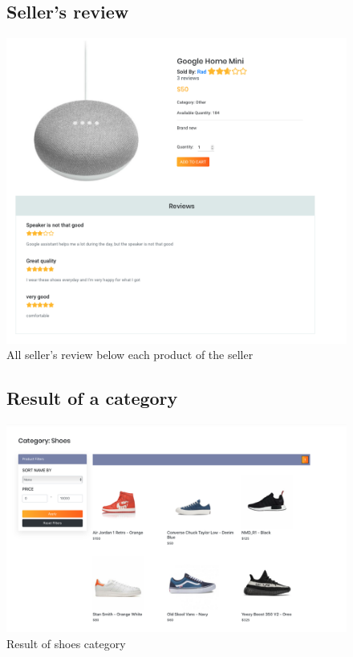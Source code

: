 \documentclass[11pt]{article}
\begin{document}
\begin{figure}[ht!]
    \subsection{Seller's review}
    \centering
    \includegraphics[width=\textwidth,height=0.3\paperheight,keepaspectratio]{Diagrams/External_Interfaces/Seller_Review.png}
    \caption{All seller's review below each product of the seller}
    \label{fig: Latest listings}
\end{figure}
\FloatBarrier

\begin{figure}[ht!]
    \subsection{Result of a category}
    \centering
    \includegraphics[width=\textwidth,height=3\paperheight,keepaspectratio]{Diagrams/External_Interfaces/Categories.png}
    \caption{Result of shoes category}
    \label{fig: Result of a category}
\end{figure}
\FloatBarrier
\end{document}
